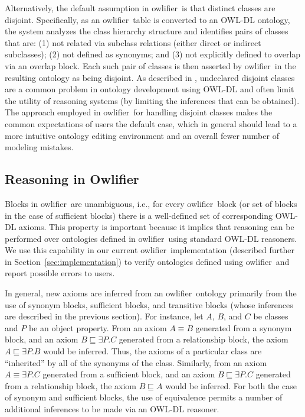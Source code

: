 \documentclass[5p,authoryear]{elsarticle}
\newcommand{\Owlifier}{\textsf{Owlifier}}
\newcommand{\owlifier}{\textsf{owlifier}}
\newcommand{\secref}[1]{Section~\ref{#1}}
\begin{document}
Alternatively, the default assumption in \owlifier\ is that distinct
classes are disjoint. Specifically, as an \owlifier\ table is
converted to an OWL-DL ontology, the system analyzes the class
hierarchy structure and identifies pairs of classes that are: (1) not
related via subclass relations (either direct or indirect subclasses);
(2) not defined as synonyms; and (3) not explicitly defined to overlap
via an overlap block. Each such pair of classes is then asserted by
\owlifier\ in the resulting ontology as being disjoint. As described
in \cite{rector04:_owl_pizzas}, undeclared disjoint classes are a
common problem in ontology development using OWL-DL and often limit
the utility of reasoning systems (by limiting the inferences that can
be obtained). The approach employed in \owlifier\ for handling
disjoint classes makes the common expectations of users the default
case, which in general should lead to a more intuitive ontology
editing environment and an overall fewer number of modeling mistakes.


\subsection{Reasoning in \Owlifier}

Blocks in \owlifier\ are unambiguous, i.e., for every \owlifier\ block
(or set of blocks in the case of sufficient blocks) there is a
well-defined set of corresponding OWL-DL axioms. This property is
important because it implies that reasoning can be performed over
ontologies defined in \owlifier\ using standard OWL-DL reasoners.  We
use this capability in our current \owlifier\ implementation
(described further in \secref{sec:implementation}) to verify
ontologies defined using \owlifier\ and report possible errors to
users.

In general, new axioms are inferred from an \owlifier\ ontology
primarily from the use of synonym blocks, sufficient blocks, and
transitive blocks (whose inferences are described in the previous
section). For instance, let $A$, $B$, and $C$ be classes and $P$ be an
object property. From an axiom $A \equiv B$ generated from a synonym
block, and an axiom $B \sqsubseteq \exists P.C$ generated from a
relationship block, the axiom $A \sqsubseteq \exists P.B$ would be
inferred. Thus, the axioms of a particular class are ``inherited'' by
all of the synonyms of the class. Similarly, from an axiom $A \equiv
\exists P. C$ generated from a sufficient block, and an axiom $B
\sqsubseteq \exists P.C$ generated from a relationship block, the axiom
$B \sqsubseteq A$ would be inferred. For both the case of synonym and
sufficient blocks, the use of equivalence permits a number of
additional inferences to be made via an OWL-DL reasoner.
\end{document}
